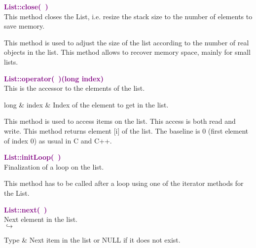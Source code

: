 \textcolor{purple}{\textbf{List::close(~)}}\label{List::close()}\\
This method closes the List, i.e. resize the stack size to the number of elements to save memory.

This method is used to adjust the size of the list according to the number of real objects in the list.
This method allows to recover memory space, mainly for small lists.

\textcolor{purple}{\textbf{List::operator(~)(long index)}}\label{List::operator()(long index)}\\
This is the accessor to the elements of the list.

\begin{tcolorbox}[width=\textwidth,myArgs,tabularx={ll|R}]
long & index & Index of the element to get in the list.
\end{tcolorbox}

This method is used to access items on the list.
This access is both read and write.
This method returns element [i] of the list.
The baseline is 0 (first element of index 0) as usual in C and C++.

\textcolor{purple}{\textbf{List::initLoop(~)}}\label{List::initLoop()}\\
Finalization of a loop on the list.

This method has to be called after a loop using one of the iterator methods for the List.

\textcolor{purple}{\textbf{List::next(~)}}\label{List::next()}\\
Next element in the list.\\ \hspace*{5mm}$\hookrightarrow$
\vspace*{-2em}\begin{tcolorbox}[grow to left by=-1cm, width=\textwidth-1cm,myArgs,tabularx={l|R}]
Type & Next item in the list or NULL if it does not exist.
\end{tcolorbox}

